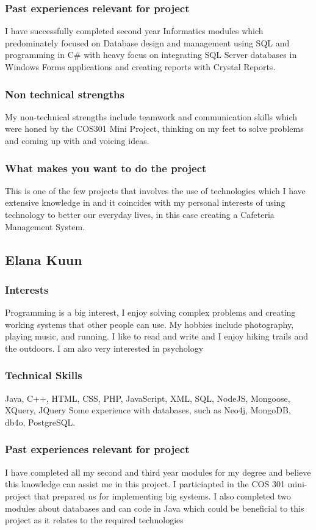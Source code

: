 \documentclass[hidelinks, 12pt, oneside]{article}
\begin{document}
\subsubsection{Past experiences relevant for project}
I have successfully completed second year Informatics modules which predominately focused on Database design and management using SQL and programming in C\# with heavy focus on integrating SQL Server databases in Windows Forms applications and creating reports with Crystal Reports.
\subsubsection{Non technical strengths}
My non-technical strengths include teamwork and communication skills which were honed by the COS301 Mini Project, thinking on my feet to solve problems and coming up with and voicing ideas.
\subsubsection{What makes you want to do the project}
This is one of the few projects that involves the use of technologies which I have extensive knowledge in and it coincides with my personal interests of using technology to better our everyday lives, in this case creating a Cafeteria Management System.

\subsection{Elana Kuun}
\subsubsection{Interests}
Programming is a big interest, I enjoy solving complex problems and creating working systems that other people can use. My hobbies include photography, playing music, and running. I like to read and write and I enjoy hiking trails and the outdoors. I am also very interested in psychology
\subsubsection{Technical Skills}
Java, C++, HTML, CSS, PHP, JavaScript, XML, SQL, NodeJS, Mongoose, XQuery, JQuery
Some experience with databases, such as Neo4j, MongoDB, db4o, PostgreSQL.

\subsubsection{Past experiences relevant for project}
I have completed all my second and third year modules for my degree and believe this knowledge can assist me in this project. I particiapted in the COS 301 mini-project that prepared us for implementing big systems. I also completed two modules about databases and can code in Java which could be beneficial to this project as it relates to the required technologies
\end{document}
